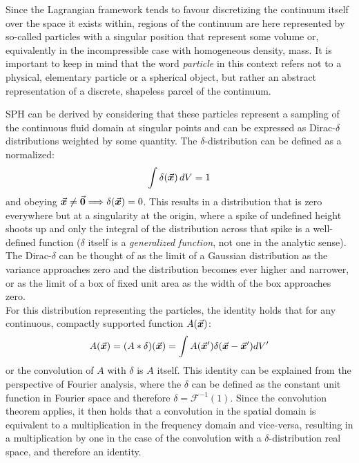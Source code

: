 Since the Lagrangian framework tends to favour discretizing the continuum itself over the space it exists within, regions of the continuum are here represented by so-called particles with a singular position that represent some volume or, equivalently in the incompressible case with homogeneous density, mass. It is important to keep in mind that the word \textit{particle} in this context refers not to a physical, elementary particle or a spherical object, but rather an abstract representation of a discrete, shapeless parcel of the continuum.

SPH can be derived by considering that these particles represent a sampling of the continuous fluid domain at singular points and can be expressed as Dirac-$\delta$ distributions weighted by some quantity. The $\delta$-distribution can be defined as a normalized:
\begin{equation}
  \int \delta(\vec{\bm{x}}) \,dV = 1
\end{equation}
and obeying $\vec{\bm{x}}\neq \vec{\bm{0}} \Longrightarrow \delta(\vec{\bm{x}}) = 0$. This results in a distribution that is zero everywhere but at a singularity at the origin, where a spike of undefined height shoots up and only the integral of the distribution across that spike is a well-defined function ($\delta$ itself is a \textit{generalized function}, not one in the analytic sense\autocite*{signal-processing-falaschi}). The Dirac-$\delta$ can be thought of as the limit of a Gaussian distribution as the variance approaches zero and the distribution becomes ever higher and narrower\autocite{tutorial}, or as the limit of a box of fixed unit area as the width of the box approaches zero.\\
For this distribution representing the particles, the identity holds that for any continuous, compactly supported function $A(\vec{\bm{x}})$\autocite{tutorial}:
\begin{equation}\label{eq:conv-identity}
  A(\vec{\bm{x}}) = (A * \delta)(\vec{\bm{x}}) = \int A(\vec{\bm{x}}') \delta(\vec{\bm{x}}-\vec{\bm{x}}')dV'
\end{equation}
or the convolution of $A$ with $\delta$ is $A$ itself. This identity can be explained from the perspective of Fourier analysis, where the $\delta$ can be defined as the constant unit function in Fourier space and therefore $\delta = \mathcal{F}^{-1}(1)$. Since the convolution theorem applies, it then holds that a convolution in the spatial domain is equivalent to a multiplication in the frequency domain and vice-versa, resulting in a multiplication by one in the case of the convolution with a $\delta$-distribution real space, and therefore an identity.


